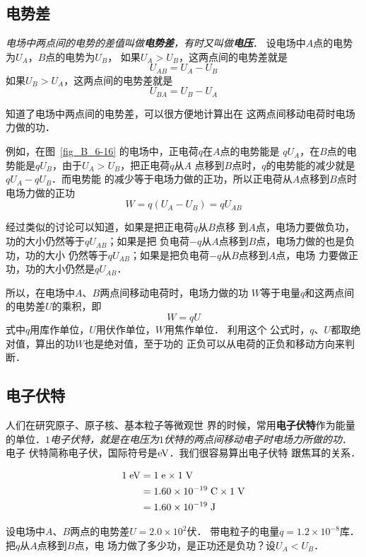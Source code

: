 \subsection{电势差}
\textit{电场中两点间的电势的差值叫做\textbf{电势差}，有时又叫做\textbf{电压}}．
设电场中$A$点的电势为$U_A$，$B$点的电势为$U_B$，
如果$U_A>U_B$，这两点间的电势差就是
\[U_{AB}=U_A-U_B \]
如果$U_B>U_A$，这两点间的电势差就是
\[U_{BA}=U_B-U_A \]

知道了电场中两点间的电势差，可以很方便地计算出在
这两点间移动电荷时电场力做的功．

例如，在图~\ref{fig_B_6-16} 的电场中，正电荷$q$在$A$点的电势能是
$qU_A$，在$B$点的电势能是$qU_B$，由于$U_A>U_B$，把正电荷$q$从$A$
点移到$B$点时，$q$的电势能的减少就是$qU_A-qU_B$．而电势能
的减少等于电场力做的正功，所以正电荷从$A$点移到$B$点时
电场力做的正功
\[W=q(U_A-U_B)=qU_{AB}\]

经过类似的讨论可以知道，如果是把正电荷$q$从$B$点移
到$A$点，电场力要做负功，功的大小仍然等于$qU_{AB}$；如果是把
负电荷$-q$从$A$点移到$B$点，电场力做的也是负功，功的大小
仍然等于$qU_{AB}$；如果是把负电荷$-q$从$B$点移到$A$点，电场
力要做正功，功的大小仍然是$qU_{AB}$．

所以，在电场中$A$、$B$两点间移动电荷时，电场力做的功
$W$等于电量$q$和这两点间的电势差$U$的乘积，即
\[W=qU\]
式中$q$用库作单位，$U$用伏作单位，$W$用焦作单位．
利用这个
公式时，$q$、$U$都取绝对值，算出的功$W$也是绝对值，至于功的
正负可以从电荷的正负和移动方向来判断．

\subsection{电子伏特}


人们在研究原子、原子核、基本粒子等微观世
界的时候，常用\textbf{电子伏特}作为能量的单位．\textit{$1$电子伏特，就是在电压为$1$伏特的两点间移动电子时电场力所做的功}．
电子
伏特简称电子伏，国际符号是$\text{eV}$．我们很容易算出电子伏特
跟焦耳的关系．

\[\begin{split}
    1 \;\text{eV} &=1 \;\text{e} \times 1 \;\text{V} \\
    &=1.60\times 10^{-19} \;\text{C} \times 1 \;\text{V}\\
&=1.60\times 10^{-19} \;\text{J} 
\end{split}    \]


\begin{example}
    设电场中$A$、$B$两点的电势差$U=2.0\times10^2$伏．
    带电粒子的电量$q=1.2\times10^{-8}$库．
    把$q$从$A$点移到$B$点，电
    场力做了多少功，是正功还是负功？设$U_A<U_B$．
\end{example}

